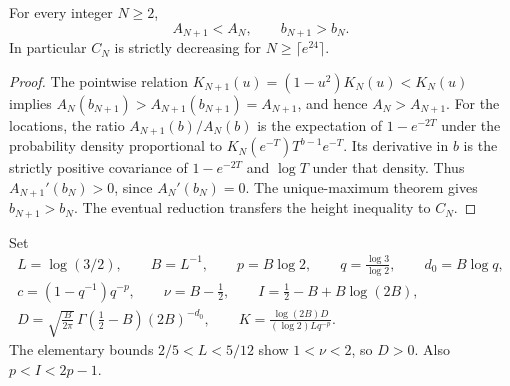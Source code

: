 \begin{corollary}
\label{lateaxis:cor:monotone}
For every integer $N\ge2$,
\[
 A_{N+1}<A_N,\qquad b_{N+1}>b_N.
\]
In particular $C_N$ is strictly decreasing for
$N\ge\lceil e^{24}\rceil$.
\end{corollary}
\begin{proof}
The pointwise relation $K_{N+1}(u)=(1-u^2)K_N(u)<K_N(u)$
implies $A_N(b_{N+1})>A_{N+1}(b_{N+1})=A_{N+1}$,
and hence $A_N>A_{N+1}$.  For the locations, the ratio
$A_{N+1}(b)/A_N(b)$ is the expectation of
$1-e^{-2T}$ under the probability density proportional to
$K_N(e^{-T})T^{b-1}e^{-T}$.  Its derivative in $b$ is the strictly
positive covariance of $1-e^{-2T}$ and $\log T$ under that density.
Thus $A_{N+1}'(b_N)>0$, since $A_N'(b_N)=0$.
The unique-maximum theorem gives $b_{N+1}>b_N$.
The eventual reduction transfers the height inequality to $C_N$.
\end{proof}

Set
\begin{gather*}
 L=\log(3/2),\qquad B=L^{-1},\qquad
 p=B\log2,\qquad q=\frac{\log3}{\log2},\qquad
 d_0=B\log q,\\
 c=(1-q^{-1})q^{-p},\qquad
 \nu=B-\frac12,\qquad
 I=\frac12-B+B\log(2B),\\
 D=\sqrt{\frac{B}{2\pi}}\,\Gamma\left(\frac12-B\right)
                          (2B)^{-d_0},\qquad
 K=\frac{\log(2B)D}{(\log2)Lq^{-p}}.
\end{gather*}
The elementary bounds $2/5<L<5/12$ show $1<\nu<2$, so
$D>0$.  Also $p<I<2p-1$.

